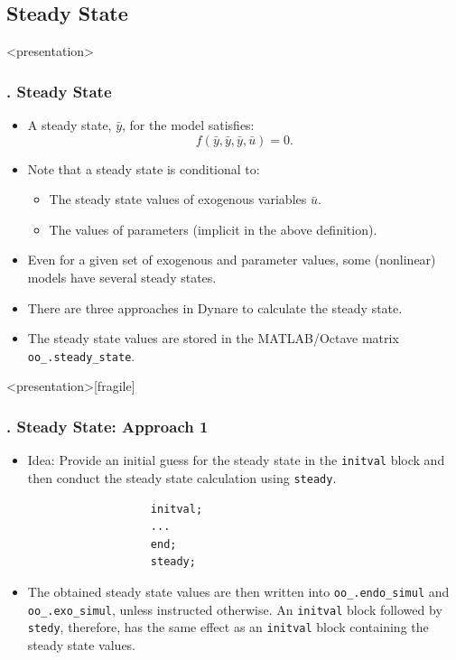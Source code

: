 \documentclass[11pt,aspectratio=169]{beamer}
\begin{document}
\subsection{Steady State}
\begin{frame}<presentation>
	\frametitle{{\thesection.\thesubsection} Steady State}
	\begin{itemize}
		\item A steady state, $\bar{y}$, for the model satisfies: $$f(\bar{y},\bar{y},\bar{y},\bar{u})=0.$$ 
		\item Note that a steady state is conditional to:
		\begin{itemize}
			\item The steady state values of exogenous variables $\bar{u}$.
			\item The values of parameters (implicit in the above definition).
		\end{itemize}
		\item Even for a given set of exogenous and parameter values, some (nonlinear) models have several steady states.
		\item There are three approaches in Dynare to calculate the steady state.
		\item The steady state values are stored in the MATLAB/Octave matrix \texttt{oo\_.steady\_state}.
	\end{itemize}
\end{frame}
\begin{frame}<presentation>[fragile]
	\frametitle{{\thesection.\thesubsection} Steady State: Approach 1}
	\begin{itemize}
		\justifying
		\item Idea: Provide an initial guess for the steady state in the \texttt{initval} block and then conduct the steady state calculation using \texttt{steady}.
			\begin{verbatim}
				   initval;
				   ...
				   end;
				   steady;
			\end{verbatim}
		\item The obtained steady state values are then written into \texttt{oo\_.endo\_simul} and \texttt{oo\_.exo\_simul}, unless instructed otherwise. An \texttt{initval} block followed by \texttt{stedy}, therefore, has the same effect as an \texttt{initval} block containing the steady state values.
	\end{itemize}
\end{frame}
\end{document}
